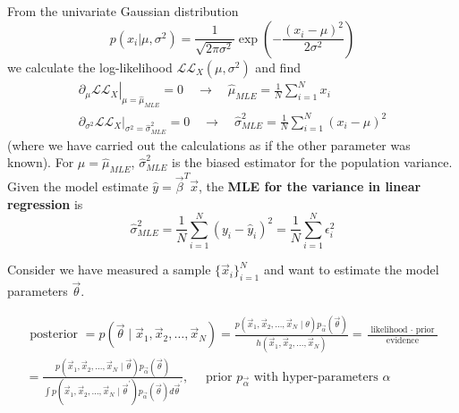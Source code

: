 From the univariate Gaussian distribution
\begin{equation}
    p(x_i | \mu, \sigma^2) = \frac{1}{\sqrt{2\pi\sigma^2}} \exp\left(-\frac{(x_i - \mu)^2}{2\sigma^2}\right)
\end{equation}
we calculate the log-likelihood $\mathcal{LL}_X(\mu,\sigma^2)$ and find
\begin{equation}
    \begin{gathered}
        \left. \partial_{\mu} \mathcal{LL}_X\right|_{\mu=\hat{\mu}_{MLE}} = 0 \quad \rightarrow \quad \hat{\mu}_{MLE} = \frac{1}{N} \sum_{i=1}^N x_i \\
        \left. \partial_{\sigma^2} \mathcal{LL}_X\right|_{\sigma^2=\hat{\sigma}^2_{MLE}} = 0 \quad \rightarrow \quad \hat{\sigma}^2_{MLE} = \frac{1}{N} \sum_{i=1}^N (x_i - \mu)^2
    \end{gathered}
\end{equation}
(where we have carried out the calculations as if the other parameter was known). For $\mu = \hat{\mu}_{MLE}$, $\hat{\sigma}^2_{MLE}$ is the
biased estimator for the population variance. Given the model estimate $\hat{y} = \vec{\beta}^T \vec{x}$, the \textbf{MLE for the variance
in linear regression} is
\begin{equation}
    \hat{\sigma}^2_{MLE} = \frac{1}{N} \sum_{i=1}^N (y_i - \hat{y}_i)^2 = \frac{1}{N} \sum_{i=1}^N \epsilon_i^2
\end{equation}

Consider we have measured a sample $\{ \vec{x}_i \}_{i=1}^N$ and 
want to estimate the model parameters $\vec{\theta}$.

\begin{equation}
    \begin{gathered}
    \text { posterior }=p\left(\vec{\theta} \mid \vec{x}_1, \vec{x}_2, \ldots, \vec{x}_N\right)=\frac{p\left(\vec{x}_1, \vec{x}_2, \ldots, \vec{x}_N \mid \theta\right) p_{\vec{\alpha}}(\vec{\theta})}{h\left(\vec{x}_1, \vec{x}_2, \ldots, \vec{x}_N\right)}=\frac{\text { likelihood } \cdot \text { prior }}{\text { evidence }} \\
    =\frac{p\left(\vec{x}_1, \vec{x}_2, \ldots, \vec{x}_N \mid \vec{\theta}\right) p_{\vec{\alpha}}(\vec{\theta})}{\int p\left(\vec{x}_1, \vec{x}_2, \ldots, \vec{x}_N \mid \vec{\theta}^{\prime}\right) p_{\vec{\alpha}}(\vec{\theta}) d \vec{\theta}^{\prime}}, \quad \text { prior } p_{\vec{\alpha}} \text { with hyper-parameters } \alpha
    \end{gathered}
\end{equation}

